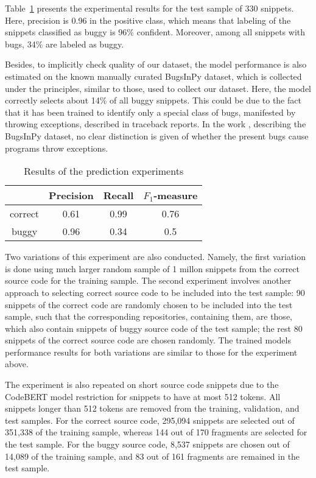 \documentclass[10pt,conference]{IEEEtran}
\begin{document}
Table~\ref{tab8} presents the experimental results for the test sample of 330 snippets.
Here, precision is 0.96 in the positive class, which means that labeling of the snippets classified as buggy is 96\% confident.
Moreover, among all snippets with bugs, 34\% are labeled as buggy.

Besides, to implicitly check quality of our dataset, the model performance is also estimated on the known manually curated BugsInPy dataset,
which is collected under the principles, similar to those, used to collect our dataset. 
Here, the model correctly selects about 14\% of all buggy snippets. This could be due to the fact that it has been trained to identify only a special
class of bugs, manifested by throwing exceptions, described in traceback reports. In the work \cite{WidyasariEtAl2020}, describing the BugsInPy dataset,
no clear distinction is given of whether the present bugs cause programs throw exceptions.

\begin{table}[htbp]
\caption{Results of the prediction experiments}
\begin{center}
\renewcommand{\arraystretch}{1.2}
\begin{tabular}{| c | c | c | c |}
\hline
    & Precision & Recall &$F_1$-measure \\
\hline
  correct & 0.61 & 0.99 & 0.76 \\
\hline
  buggy & 0.96 & 0.34 & 0.5 \\
\hline
\end{tabular}
\label{tab8}
\end{center}
\end{table}

Two variations of this experiment are also conducted. Namely, the first variation is done using much larger random sample of 1 millon snippets from the correct source code
for the training sample. The second experiment involves another approach to selecting correct source code to be included into the test sample: 90 snippets of the correct
code are randomly chosen to be included into the test sample, such that the corresponding repositories, containing them, are those, which also contain snippets of buggy source code of the test sample;
the rest 80 snippets of the correct source code are chosen randomly. The trained models performance results for both variations are similar to those for the experiment above.

The experiment is also repeated on short source code snippets due to the CodeBERT model restriction for snippets to have at most 512 tokens.
All snippets longer than 512 tokens are removed from the training, validation, and test samples.
For the correct source code, 295,094 snippets are selected out of 351,338 of the training sample, whereas 144 out of 170 fragments are selected for the test sample.
For the buggy source code, 8,537 snippets are chosen out of 14,089 of the training sample, and 83 out of 161 fragments are remained in the test sample.
\end{document}
